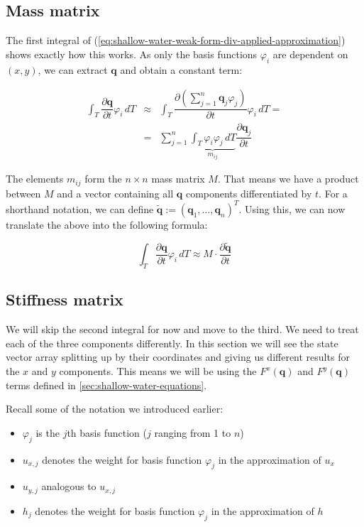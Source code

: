 \documentclass{article}
\newcommand{\pd}[2]{\dfrac{\partial #1}{\partial #2}}
\renewcommand{\phi}{\varphi}
\begin{document}
\subsection{Mass matrix}
\label{sec:mass-matrix}

The first integral of (\ref{eq:shallow-water-weak-form-div-applied-approximation}) shows exactly how this works. As only the basis functions $\phi_i$ are dependent on $(x,y)$, we can extract $\mathbf{q}$ and obtain a constant term:

\begin{eqnarray*}
  \int_T \pd {\mathbf{q}}{t} \phi_i \, dT & \approx &
  \int_T \pd {\left( \sum_{j=1}^n \mathbf{q}_j \phi_j \right) }{t} \phi_i \, dT = \\
  & = & \sum_{j=1}^n \underbrace{\int_T \phi_i \phi_j \, dT}_{m_{ij}} \pd{\mathbf{q}_j}{t}
\end{eqnarray*}

The elements $m_{ij}$ form the $n \times n$ mass matrix $M$. That means we have a product between $M$ and a vector containing all $\mathbf{q}$ components differentiated by $t$. For a shorthand notation, we can define $\tilde{\mathbf{q}} := \left( \mathbf{q}_1 , \dots , \mathbf{q}_n \right)^T$. Using this, we can now translate the above into the following formula:

\begin{equation*}
  \int_T \pd {\mathbf{q}}{t} \phi_i \, dT \approx
  M \cdot \pd{
    \tilde{\mathbf{q}}}{t}
\end{equation*}

\subsection{Stiffness matrix}
\label{sec:stiffness-matrix}

We will skip the second integral for now and move to the third. We need to treat each of the three components differently. In this section we will see the state vector array splitting up by their coordinates and giving us different results for the $x$ and $y$ components. This means we will be using the $F^x\left(\mathbf{q}\right)$ and $F^y\left(\mathbf{q}\right)$ terms defined in \ref{sec:shallow-water-equations}.

Recall some of the notation we introduced earlier:
\begin{itemize}
\item $\phi_j$ is the $j$th basis function ($j$ ranging from 1 to $n$)
\item $u_{x,j}$ denotes the weight for basis function $\phi_j$ in the approximation of $u_x$
\item $u_{y,j}$ analogous to $u_{x,j}$
\item $h_j$ denotes the weight for basis function $\phi_j$ in the approximation of $h$
\end{itemize}
\end{document}
